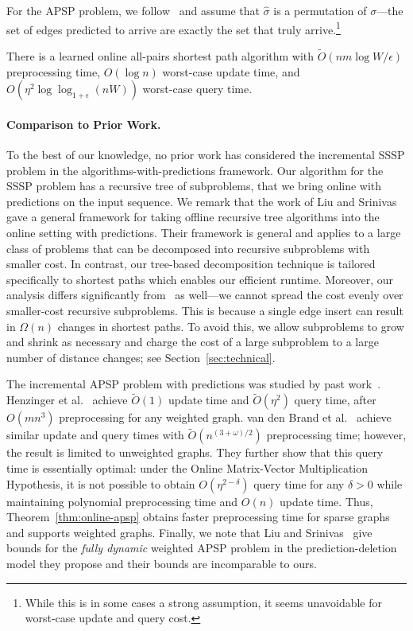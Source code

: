 For the APSP problem, we follow~\cite{HenzingerSSY24,BrandFNP24} and assume that $\hat{\sigma}$ is a permutation of $\sigma$---the set of edges predicted to arrive are exactly the set that truly arrive.\footnote{While this is in some cases a strong assumption, it seems unavoidable for worst-case update and query cost.} 

\begin{theorem}\label{thm:online-apsp}
    There is a learned online all-pairs shortest path algorithm with $\tilde{O}(nm\log W / \epsilon)$ preprocessing time, $O(\log n)$ worst-case update time, and $O(\eta^2\log\log_{1 + \epsilon} (nW))$ worst-case query time.
\end{theorem}

\paragraph{Comparison to Prior Work.} 

To the best of our knowledge, no prior work has considered the incremental SSSP problem in the algorithms-with-predictions framework. Our algorithm for the SSSP problem has a recursive tree of subproblems, that we bring online with predictions on the input sequence.  We remark that the work of   Liu and Srinivas \cite{liu2023predicted} gave a general framework for taking offline recursive tree algorithms into the online setting with predictions. Their framework is general and applies to a large class of problems that can be decomposed into recursive subproblems with smaller cost.
In contrast, our tree-based decomposition technique is tailored specifically to shortest paths which enables our efficient runtime.  Moreover, our analysis differs significantly from~\cite{liu2023predicted} as well---we cannot spread the cost evenly over smaller-cost recursive subproblems.  This is because a single edge insert can result in $\Omega(n)$ changes in shortest paths.  To avoid this, we allow subproblems to grow and shrink as necessary and charge the cost of a large subproblem to a large number of distance changes; see Section~\ref{sec:technical}.

The incremental APSP problem with predictions was studied by past work~\cite{HenzingerSSY24,BrandFNP24}.  Henzinger et al.~\cite{HenzingerSSY24} achieve $\tilde{O}(1)$ update time and $\tilde{O}(\eta^2)$ query time, after $O(mn^3)$ preprocessing for any weighted graph.
van den Brand et al.~\cite{BrandFNP24} achieve similar update and query times with $\tilde{O}(n^{(3 + \omega)/2})$ preprocessing time; however, the result is limited to unweighted graphs.  
They further show that this query time is essentially optimal: under the Online Matrix-Vector Multiplication Hypothesis, it is not possible to obtain $O(\eta^{2-\delta})$ query time for any $\delta > 0$ while maintaining polynomial preprocessing time and $O(n)$ update time.
Thus, Theorem~\ref{thm:online-apsp} obtains faster preprocessing time for sparse graphs and supports weighted graphs.  Finally, we note that Liu and Srinivas~\cite{liu2023predicted} give bounds for the \emph{fully dynamic} weighted APSP problem in the prediction-deletion model they propose and their bounds are incomparable to ours.
